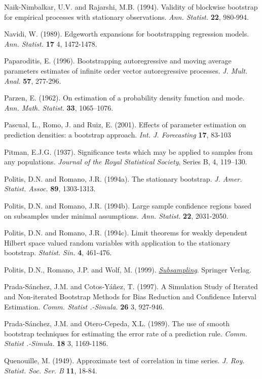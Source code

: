 \documentclass[]{book}
\theoremstyle{break}
\theoremstyle{definition}
\theoremstyle{definition}
\theoremstyle{definition}
\theoremstyle{remark}
\begin{document}
Naik-Nimbalkar, U.V. and Rajarshi, M.B. (1994). Validity of blockwise
bootstrap for empirical processes with stationary observations.
\emph{Ann. Statist.} \textbf{22}, 980-994.

Navidi, W. (1989). Edgeworth expansions for bootstrapping regression
models. \emph{Ann. Statist.} \textbf{17} 4, 1472-1478.

Paparoditis, E. (1996). Bootstrapping autoregressive and moving average
parameters estimates of infinite order vector autoregressive processes.
\emph{J. Mult. Anal.} \textbf{57}, 277-296.

Parzen, E. (1962). On estimation of a probability density function and
mode. \emph{Ann. Math. Statist.} \textbf{33}, 1065--1076.

Pascual, L., Romo, J. and Ruiz, E. (2001). Effects of parameter
estimation on prediction densities: a bootstrap approach. \emph{Int. J.
Forecasting} \textbf{17}, 83-103

Pitman, E.J.G. (1937). Significance tests which may be applied to
samples from any populations. \emph{Journal of the Royal Statistical
Society}, Series B, 4, 119--130.

Politis, D.N. and Romano, J.R. (1994a). The stationary bootstrap.
\emph{J. Amer. Statist. Assoc.} \textbf{89}, 1303-1313.

Politis, D.N. and Romano, J.R. (1994b). Large sample confidence regions
based on subsamples under minimal assumptions. \emph{Ann. Statist.}
\textbf{22}, 2031-2050.

Politis, D.N. and Romano, J.R. (1994c). Limit theorems for weakly
dependent Hilbert space valued random variables with application to the
stationary bootstrap. \emph{Statist. Sin.} \textbf{4}, 461-476.

Politis, D.N., Romano, J.P. and Wolf, M. (1999).
\href{https://books.google.es/books?hl=es\&lr=\&id=nGu6rqjE6JoC\&oi=fnd\&pg=PR7\&dq=Subsampling}{\emph{Subsampling}}.
Springer Verlag.

Prada-Sánchez, J.M. and Cotos-Yáñez, T. (1997). A Simulation Study of
Iterated and Non-iterated Bootstrap Methods for Bias Reduction and
Confidence Interval Estimation. \emph{Comm. Statist .-Simula.}
\textbf{26} 3, 927-946.

Prada-Sánchez, J.M. and Otero-Cepeda, X.L. (1989). The use of smooth
bootstrap techniques for estimating the error rate of a prediction rule.
\emph{Comm. Statist .-Simula.} \textbf{18} 3, 1169-1186.

Quenouille, M. (1949). Approximate test of correlation in time series.
\emph{J. Roy. Statist. Soc. Ser. B} \textbf{11}, 18-84.
\end{document}
